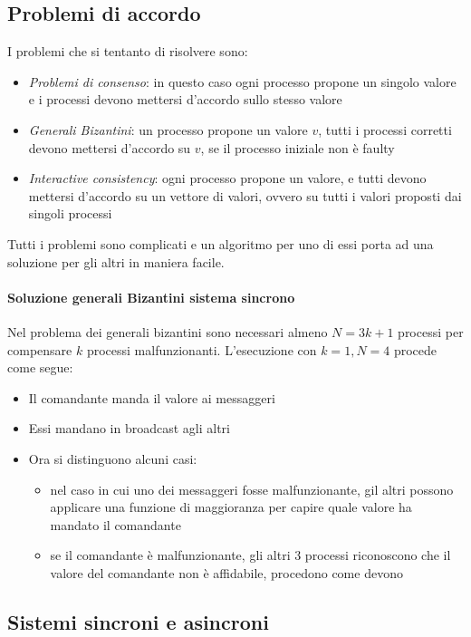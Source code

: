 \subsection{Problemi di accordo}
I problemi che si tentanto di risolvere sono:
\begin{itemize}
    \item \emph{Problemi di consenso}: in questo caso ogni processo 
    propone un singolo valore e i processi devono mettersi d'accordo 
    sullo stesso valore
    \item \emph{Generali Bizantini}: un processo propone un valore $v$, 
    tutti i processi corretti devono mettersi d'accordo su $v$, se 
    il processo iniziale non è faulty
    \item \emph{Interactive consistency}: ogni processo propone un valore, 
    e tutti devono mettersi d'accordo su un vettore di valori, 
    ovvero su tutti i valori proposti dai singoli processi
\end{itemize}

Tutti i problemi sono complicati e un algoritmo per uno di essi 
porta ad una soluzione per gli altri in maniera facile.

\paragraph{Soluzione generali Bizantini sistema sincrono}
Nel problema dei generali bizantini sono necessari almeno 
$N = 3k + 1$ processi per compensare $k$ processi malfunzionanti.
L'esecuzione con $k = 1, N = 4$ procede come segue: 
\begin{itemize}
    \item Il comandante manda il valore ai messaggeri
    \item Essi mandano in broadcast agli altri
    \item Ora si distinguono alcuni casi:
    \begin{itemize}
        \item nel caso in cui uno dei messaggeri fosse malfunzionante, 
        gil altri possono applicare una funzione di maggioranza 
        per capire quale valore ha mandato il comandante
        \item se il comandante è malfunzionante, gli altri 3 processi 
        riconoscono che il valore del comandante non è affidabile, 
        procedono come devono
    \end{itemize}
\end{itemize}

\subsection{Sistemi sincroni e asincroni}


